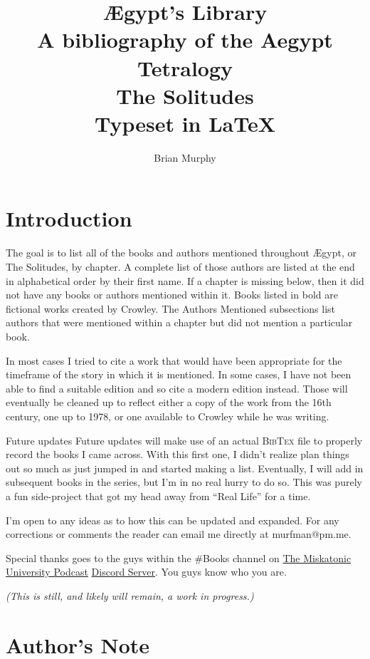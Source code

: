 \documentclass[twoside,10pt]{report}
\author{Brian Murphy}
\title{
 {\Huge Ægypt's Library} \\
 {\footnotesize A bibliography of the Aegypt Tetralogy \\
 \bigskip
 {\Large The Solitudes} \\
 \bigskip
 Typeset in \LaTeX{} \\
 }
}
\date{\begin{small}\today{}\end{small}}
\newcommand\blankpage{%
    \null
    \thispagestyle{empty}%
    \addtocounter{page}{-1}%
    \newpage%
    \pagestyle{fancy}}
\begin{document}


\afterpage{\blankpage}


\setcounter{tocdepth}{2}
\tableofcontents
\pagestyle{fancy}

\pagestyle{fancy}
\chapter{Introduction}
The goal is to list all of the books and authors mentioned throughout Ægypt, or The Solitudes, by chapter. A complete list of those authors are listed at the end in alphabetical order by their first name. If a chapter is missing below, then it did not have any books or authors mentioned within it. Books listed in bold are fictional works created by Crowley. The Authors Mentioned subsections list authors that were mentioned within a chapter but did not mention a particular book.

In most cases I tried to cite a work that would have been appropriate for the timeframe of the story in which it is mentioned. In some cases, I have not been able to find a suitable edition and so cite a modern edition instead. Those will eventually be cleaned up to reflect either a copy of the work from the 16th century, one up to 1978, or one available to Crowley while he was writing.

Future updates Future updates will make use of an actual \textsc{BibTex} file to properly record the books I came across. With this first one, I didn't realize plan things out so much as just jumped in and started making a list. Eventually, I will add in subsequent books in the series, but I’m in no real hurry to do so. This was purely a fun side-project that got my head away from “Real Life” for a time.

I’m open to any ideas as to how this can be updated and expanded. For any corrections or comments the reader can email me directly at murfman@pm.me.

Special thanks goes to the guys within the \#Books channel on \href{https://www.mu-podcast.com}{The Miskatonic University Podcast} \href{https://discord.gg/5nH7UqtpdM}{Discord Server}. You guys know who you are.
\bigskip
\begin{center}
\textit{(This is still, and likely will remain, a work in progress.)}
\end{center}


\chapter{Author's Note}
\end{document}
